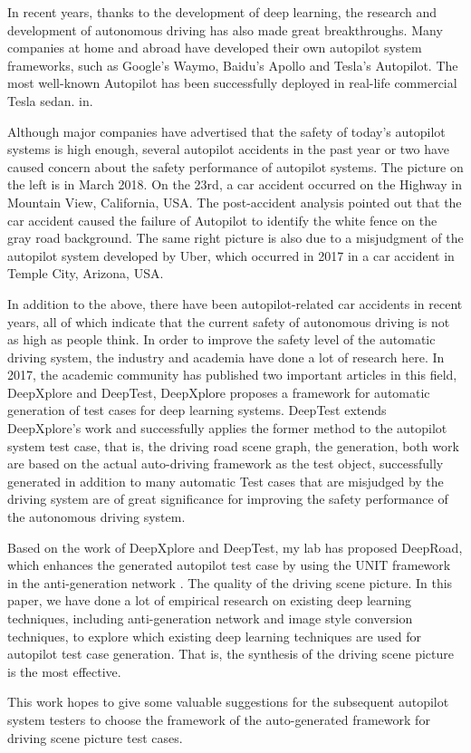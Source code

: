 \begin{eabstract}
  In recent years, thanks to the development of deep learning, the research and development of autonomous driving has also made great breakthroughs. Many companies at home and abroad have developed their own autopilot system frameworks, such as Google's Waymo, Baidu's Apollo and Tesla's Autopilot. The most well-known Autopilot has been successfully deployed in real-life commercial Tesla sedan. in.

  Although major companies have advertised that the safety of today's autopilot systems is high enough, several autopilot accidents in the past year or two have caused concern about the safety performance of autopilot systems. The picture on the left is in March 2018. On the 23rd, a car accident occurred on the Highway in Mountain View, California, USA. The post-accident analysis pointed out that the car accident caused the failure of Autopilot to identify the white fence on the gray road background. The same right picture is also due to a misjudgment of the autopilot system developed by Uber, which occurred in 2017 in a car accident in Temple City, Arizona, USA.

  In addition to the above, there have been autopilot-related car accidents in recent years, all of which indicate that the current safety of autonomous driving is not as high as people think. In order to improve the safety level of the automatic driving system, the industry and academia have done a lot of research here. In 2017, the academic community has published two important articles in this field, DeepXplore\cite{DeepXplore} and DeepTest\cite{ DeepTest}, DeepXplore proposes a framework for automatic generation of test cases for deep learning systems. DeepTest extends DeepXplore's work and successfully applies the former method to the autopilot system test case, that is, the driving road scene graph, the generation, both work are based on the actual auto-driving framework as the test object, successfully generated in addition to many automatic Test cases that are misjudged by the driving system are of great significance for improving the safety performance of the autonomous driving system.

  Based on the work of DeepXplore and DeepTest, my lab has proposed DeepRoad\cite{DeepRoad}, which enhances the generated autopilot test case by using the UNIT\cite{UNIT} framework in the anti-generation network \cite{GAN}. The quality of the driving scene picture. In this paper, we have done a lot of empirical research on existing deep learning techniques, including anti-generation network and image style conversion techniques, to explore which existing deep learning techniques are used for autopilot test case generation. That is, the synthesis of the driving scene picture is the most effective.

  This work hopes to give some valuable suggestions for the subsequent autopilot system testers to choose the framework of the auto-generated framework for driving scene picture test cases.
\end{eabstract}

